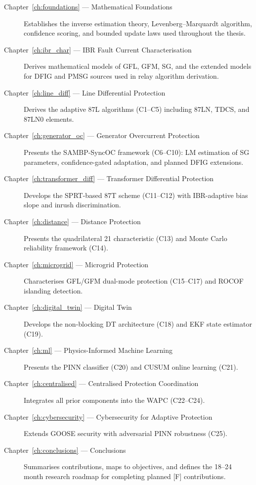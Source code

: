\begin{description}
\item[Chapter~\ref{ch:foundations} --- Mathematical Foundations]
  Establishes the inverse estimation theory, Levenberg--Marquardt algorithm,
  confidence scoring, and bounded update laws used throughout the thesis.

\item[Chapter~\ref{ch:ibr_char} --- IBR Fault Current Characterisation]
  Derives mathematical models of GFL, GFM, SG, and the extended models for
  DFIG and PMSG sources used in relay algorithm derivation.

\item[Chapter~\ref{ch:line_diff} --- Line Differential Protection]
  Derives the adaptive 87L algorithms (C1--C5) including 87LN, TDCS, and
  87LN0 elements.

\item[Chapter~\ref{ch:generator_oc} --- Generator Overcurrent Protection]
  Presents the SAMBP-SyncOC framework (C6--C10): LM estimation of SG
  parameters, confidence-gated adaptation, and planned DFIG extensions.

\item[Chapter~\ref{ch:transformer_diff} --- Transformer Differential Protection]
  Develops the SPRT-based 87T scheme (C11--C12) with IBR-adaptive bias slope
  and inrush discrimination.

\item[Chapter~\ref{ch:distance} --- Distance Protection]
  Presents the quadrilateral 21 characteristic (C13) and Monte Carlo
  reliability framework (C14).

\item[Chapter~\ref{ch:microgrid} --- Microgrid Protection]
  Characterises GFL/GFM dual-mode protection (C15--C17) and ROCOF islanding
  detection.

\item[Chapter~\ref{ch:digital_twin} --- Digital Twin]
  Develops the non-blocking DT architecture (C18) and EKF state estimator (C19).

\item[Chapter~\ref{ch:ml} --- Physics-Informed Machine Learning]
  Presents the PINN classifier (C20) and CUSUM online learning (C21).

\item[Chapter~\ref{ch:centralised} --- Centralised Protection Coordination]
  Integrates all prior components into the WAPC (C22--C24).

\item[Chapter~\ref{ch:cybersecurity} --- Cybersecurity for Adaptive Protection]
  Extends GOOSE security with adversarial PINN robustness (C25).

\item[Chapter~\ref{ch:conclusions} --- Conclusions]
  Summarises contributions, maps to objectives, and defines the 18--24 month
  research roadmap for completing planned [F] contributions.
\end{description}

